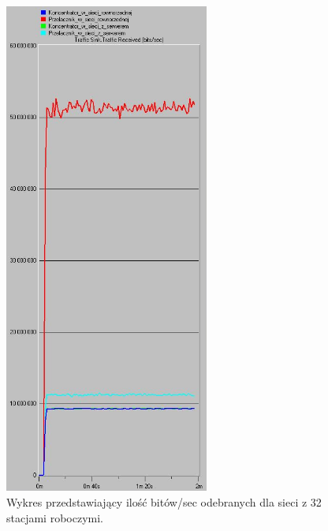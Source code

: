 \documentclass{article}
\begin{document}
\begin{figure}[H]
  \centering
  \includegraphics[width=0.60\textwidth]{screens/32_recv.png}
 \caption{Wykres przedstawiający ilość bitów/sec odebranych dla sieci z 32 stacjami roboczymi.}
 \label{fig:32stacjer}
\end{figure}
\end{document}
